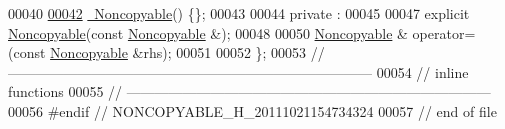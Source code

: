 \begin{DoxyCode}
00040 
\hypertarget{noncopyable_8h_source_l00042}{}\hyperlink{classhryky_1_1_noncopyable_aa692057b9d2b49976ae79e35d33009a4}{00042}     \hyperlink{classhryky_1_1_noncopyable_aa692057b9d2b49976ae79e35d33009a4}{~Noncopyable}() \{\};
00043 
00044 \textcolor{keyword}{private} :
00045 
00047     \textcolor{keyword}{explicit} \hyperlink{classhryky_1_1_noncopyable_a4be18fc3db624b52a1326d4a29058feb}{Noncopyable}(\textcolor{keyword}{const} \hyperlink{classhryky_1_1_noncopyable}{Noncopyable} &);
00048 
00050     \hyperlink{classhryky_1_1_noncopyable}{Noncopyable} & operator=(\textcolor{keyword}{const} \hyperlink{classhryky_1_1_noncopyable}{Noncopyable} &rhs);
00051 
00052 \};
00053 \textcolor{comment}{//
      ------------------------------------------------------------------------------}
00054 \textcolor{comment}{// inline functions}
00055 \textcolor{comment}{//
      ------------------------------------------------------------------------------}
00056 \textcolor{preprocessor}{#endif // NONCOPYABLE\_H\_20111021154734324}
00057 \textcolor{preprocessor}{}\textcolor{comment}{// end of file}
\end{DoxyCode}
